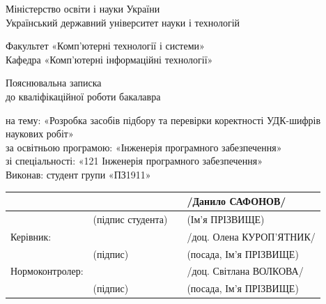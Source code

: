 \documentclass[14pt]{extarticle}
\begin{document}
\begin{spacing}{1}
\begin{center}
  Міністерство освіти і науки України\\
  Український державний університет науки і технологій\\

  \vspace{\baselineskip}

  Факультет «Комп'ютерні технології і системи»\\
  Кафедра «Комп'ютерні інформаційні технології»\\

  \vspace{\baselineskip}
  \vspace{\baselineskip}

  {\fontsize{18}{18}\selectfont  Пояснювальна записка}\\
  до кваліфікаційної роботи бакалавра
\end{center}
на тему: «Розробка засобів підбору та перевірки коректності
УДК-шифрів наукових робіт»\\
за освітньою програмою: «Інженерія програмного забезпечення»\\
зі  спеціальності: «121 Інженерія програмного забезпечення»\\
Виконав: студент групи «ПЗ1911»\\

\noindent
\begin{tabularx}{\textwidth}{@{}>{\RaggedRight}lXp{0.7cm}l}
                  &                                             & & /Данило САФОНОВ/ \\ \cline{2-2} \cline{4-4}
                  & \fontsize{9}{9}\selectfont(підпис студента) & & \fontsize{9}{9}\selectfont(Ім’я ПРІЗВИЩЕ) \\
  Керівник:       &                                             & & /доц. Олена КУРОП'ЯТНИК/ \\ \cline{2-2} \cline{4-4}
                  & \fontsize{9}{9}\selectfont(підпис)          & & \fontsize{9}{9}\selectfont(посада, Ім’я ПРІЗВИЩЕ) \\
  Нормоконтролер: &                                             & & /доц. Світлана ВОЛКОВА/ \\ \cline{2-2} \cline{4-4}
                  & \fontsize{9}{9}\selectfont(підпис)          & & \fontsize{9}{9}\selectfont(посада, Ім’я ПРІЗВИЩЕ) \\
\end{tabularx}


\end{spacing}
\end{document}
